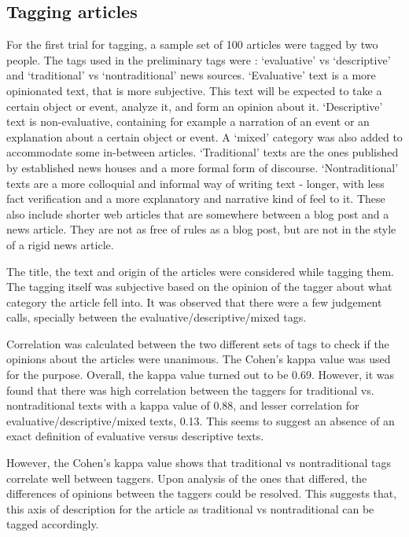 \documentclass[11pt]{article}
\begin{document}
\subsection {Tagging articles}

For the first trial for tagging, a sample set of 100 articles were tagged by two people. The tags used in the preliminary tags were : ‘evaluative’ vs ‘descriptive’ and ‘traditional’ vs ‘nontraditional’ news sources. ‘Evaluative’ text is a more opinionated text, that is more subjective. This text will be expected to take a certain object or event, analyze it,  and form an opinion about it. ‘Descriptive’ text is non-evaluative, containing for example a narration of an event or an explanation about a certain object or event. A ‘mixed’ category was also added to accommodate some in-between articles. ‘Traditional’ texts are the ones published by established news houses and a more formal form of discourse. ‘Nontraditional’ texts are a more colloquial and informal way of writing text - longer, with less fact verification and a more explanatory and narrative kind of feel to it. These also include shorter web articles that are somewhere between a blog post and a news article. They are not as free of rules as a blog post, but are not in the style of a rigid news article.

The title, the text and origin of the articles were considered while tagging them. The tagging itself was subjective based on the opinion of the tagger about what category the article fell into. It was observed that there were a few judgement calls, specially between the evaluative/descriptive/mixed tags.

Correlation was calculated between the two different sets of tags to check if the opinions about the articles were unanimous. The Cohen’s kappa value was used for the purpose. Overall, the kappa value turned out to be 0.69. However, it was found that there was high correlation between the taggers for traditional vs. nontraditional texts with a kappa value of 0.88, and lesser correlation for evaluative/descriptive/mixed texts, 0.13. This seems to suggest an absence of an exact definition of evaluative versus descriptive texts. 

However, the Cohen’s kappa value shows that traditional vs nontraditional tags correlate well between taggers. Upon analysis of the ones that differed, the differences of opinions between the taggers could be resolved. This suggests that, this axis of description for the article as traditional vs nontraditional can be tagged accordingly.
\end{document}
